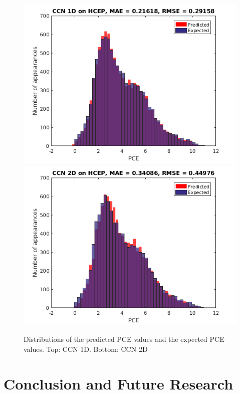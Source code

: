 \documentclass[a4paper]{article}
\begin{document}
\begin{figure}[h]
\caption{Distributions of the predicted PCE values and the expected PCE values. Top: CCN 1D. Bottom: CCN 2D}\label{fig:predict_vs_actual}
\includegraphics[width=\columnwidth]{Result_CCN_1D}
\includegraphics[width=\columnwidth]{Result_CCN_2D}
\end{figure}

\section{Conclusion and Future Research}
\end{document}
